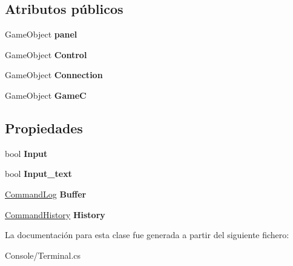 \subsection*{Atributos públicos}
\begin{DoxyCompactItemize}
\item 
\mbox{\label{class_command_terminal_1_1_terminal_a685acbda06ea2b49b4382ba2a10898af}} 
Game\+Object {\bfseries panel}
\item 
\mbox{\label{class_command_terminal_1_1_terminal_ad80c14560c6e2d60132f69207b3e7717}} 
Game\+Object {\bfseries Control}
\item 
\mbox{\label{class_command_terminal_1_1_terminal_a84a9d02996f0d90521fb980137713861}} 
Game\+Object {\bfseries Connection}
\item 
\mbox{\label{class_command_terminal_1_1_terminal_a2728f93342de1de68cfe1457fa2ce2a2}} 
Game\+Object {\bfseries GameC}
\end{DoxyCompactItemize}
\subsection*{Propiedades}
\begin{DoxyCompactItemize}
\item 
\mbox{\label{class_command_terminal_1_1_terminal_af161aa7c73b689b1fc9143d1c5644d10}} 
bool {\bfseries Input}
\item 
\mbox{\label{class_command_terminal_1_1_terminal_a5718500e14f3521ba62c1d2db926a1bf}} 
bool {\bfseries Input\+\_\+text}
\item 
\mbox{\label{class_command_terminal_1_1_terminal_ac767b28d5c7b0e40483af24df404608c}} 
\mbox{\hyperlink{class_command_terminal_1_1_command_log}{Command\+Log}} {\bfseries Buffer}
\item 
\mbox{\label{class_command_terminal_1_1_terminal_a45a376c35f548d7498be0cbfe395df72}} 
\mbox{\hyperlink{class_command_terminal_1_1_command_history}{Command\+History}} {\bfseries History}
\end{DoxyCompactItemize}


La documentación para esta clase fue generada a partir del siguiente fichero\+:\begin{DoxyCompactItemize}
\item 
Console/Terminal.\+cs\end{DoxyCompactItemize}
